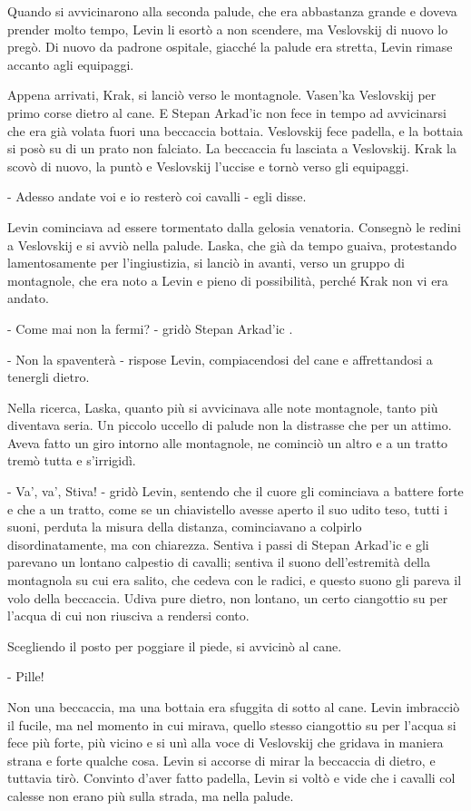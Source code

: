 Quando si avvicinarono alla seconda palude, che era abbastanza grande e doveva prender molto tempo, Levin li esortò a non scendere, ma Veslovskij di nuovo lo pregò. Di nuovo da padrone ospitale, giacché la palude era stretta, Levin rimase accanto agli equipaggi. 

Appena arrivati, Krak, si lanciò verso le montagnole. Vasen'ka Veslovskij per primo corse dietro al cane. E Stepan Arkad'ic non fece in tempo ad avvicinarsi che era già volata fuori una beccaccia bottaia. Veslovskij fece padella, e la bottaia si posò su di un prato non falciato. La beccaccia fu lasciata a Veslovskij. Krak la scovò di nuovo, la puntò e Veslovskij l'uccise e tornò verso gli equipaggi. 

- Adesso andate voi e io resterò coi cavalli - egli disse. 

Levin cominciava ad essere tormentato dalla gelosia venatoria. Consegnò le redini a Veslovskij e si avviò nella palude. Laska, che già da tempo guaiva, protestando lamentosamente per l'ingiustizia, si lanciò in avanti, verso un gruppo di montagnole, che era noto a Levin e pieno di possibilità, perché Krak non vi era andato. 

- Come mai non la fermi? - gridò Stepan Arkad'ic . 

- Non la spaventerà - rispose Levin, compiacendosi del cane e affrettandosi a tenergli dietro. 

Nella ricerca, Laska, quanto più si avvicinava alle note montagnole, tanto più diventava seria. Un piccolo uccello di palude non la distrasse che per un attimo. Aveva fatto un giro intorno alle montagnole, ne cominciò un altro e a un tratto tremò tutta e s'irrigidì. 

- Va', va', Stiva! - gridò Levin, sentendo che il cuore gli cominciava a battere forte e che a un tratto, come se un chiavistello avesse aperto il suo udito teso, tutti i suoni, perduta la misura della distanza, cominciavano a colpirlo disordinatamente, ma con chiarezza. Sentiva i passi di Stepan Arkad'ic e gli parevano un lontano calpestio di cavalli; sentiva il suono dell'estremità della montagnola su cui era salito, che cedeva con le radici, e questo suono gli pareva il volo della beccaccia. Udiva pure dietro, non lontano, un certo ciangottio su per l'acqua di cui non riusciva a rendersi conto. 

Scegliendo il posto per poggiare il piede, si avvicinò al cane. 

- Pille! 

Non una beccaccia, ma una bottaia era sfuggita di sotto al cane. Levin imbracciò il fucile, ma nel momento in cui mirava, quello stesso ciangottio su per l'acqua si fece più forte, più vicino e si unì alla voce di Veslovskij che gridava in maniera strana e forte qualche cosa. Levin si accorse di mirar la beccaccia di dietro, e tuttavia tirò. Convinto d'aver fatto padella, Levin si voltò e vide che i cavalli col calesse non erano più sulla strada, ma nella palude. 

